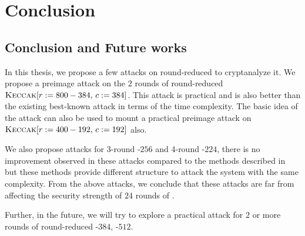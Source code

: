 \chapter{Conclusion}

\section{Conclusion and Future works}
In this thesis, we propose a few attacks on round-reduced \KECCAK{} to cryptanalyze it. We propose a preimage attack on the $2$ rounds of round-reduced $\mbox{\textsc{Keccak}}[r:=800-384,\,c:=384]$. This attack is practical and is also better than the existing best-known attack in terms of the time complexity. The basic idea of the attack can also be used to mount a practical preimage attack on $\mbox{\textsc{Keccak}}[r:=400-192,\, c:=192]$ also.
 
We also propose attacks for 3-round \Keccak{}-$256$ and 4-round \Keccak-$224$, there is no improvement observed in these attacks compared to the methods described in~\cite{guo2016linear} but these methods provide different structure to attack the system with the same complexity.
From the above attacks, we conclude that these attacks are far from affecting the security strength of $24$ rounds of \Keccak{}.

Further, in the future, we will try to explore a practical attack for $2$ or more rounds of round-reduced \KECCAK-$384$, \KECCAK-$512$.
